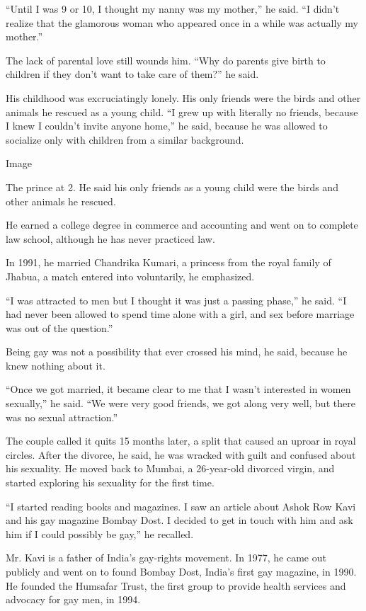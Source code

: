 ``Until I was 9 or 10, I thought my nanny was my mother,'' he said. ``I
didn't realize that the glamorous woman who appeared once in a while was
actually my mother.''

The lack of parental love still wounds him. ``Why do parents give birth
to children if they don't want to take care of them?'' he said.

His childhood was excruciatingly lonely. His only friends were the birds
and other animals he rescued as a young child. ``I grew up with
literally no friends, because I knew I couldn't invite anyone home,'' he
said, because he was allowed to socialize only with children from a
similar background.

Image

The prince at 2. He said his only friends as a young child were the
birds and other animals he rescued.

He earned a college degree in commerce and accounting and went on to
complete law school, although he has never practiced law.

In 1991, he married Chandrika Kumari, a princess from the royal family
of Jhabua, a match entered into voluntarily, he emphasized.

``I was attracted to men but I thought it was just a passing phase,'' he
said. ``I had never been allowed to spend time alone with a girl, and
sex before marriage was out of the question.''

Being gay was not a possibility that ever crossed his mind, he said,
because he knew nothing about it.

``Once we got married, it became clear to me that I wasn't interested in
women sexually,'' he said. ``We were very good friends, we got along
very well, but there was no sexual attraction.''

The couple called it quits 15 months later, a split that caused an
uproar in royal circles. After the divorce, he said, he was wracked with
guilt and confused about his sexuality. He moved back to Mumbai, a
26-year-old divorced virgin, and started exploring his sexuality for the
first time.

``I started reading books and magazines. I saw an article about Ashok
Row Kavi and his gay magazine Bombay Dost. I decided to get in touch
with him and ask him if I could possibly be gay,'' he recalled.

Mr. Kavi is a father of India's gay-rights movement. In 1977, he came
out publicly and went on to found Bombay Dost, India's first gay
magazine, in 1990. He founded the Humsafar Trust, the first group to
provide health services and advocacy for gay men, in 1994.

